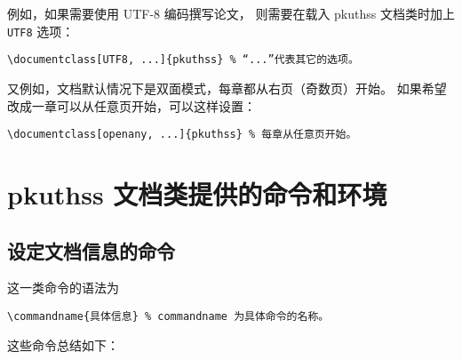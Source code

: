 例如，如果需要使用 UTF-8 编码撰写论文，
则需要在载入 pkuthss 文档类时加上 \verb|UTF8| 选项：
\begin{Verbatim}[frame = single]
\documentclass[UTF8, ...]{pkuthss} % “...”代表其它的选项。
\end{Verbatim}

又例如，文档默认情况下是双面模式，每章都从右页（奇数页）开始。
如果希望改成一章可以从任意页开始，可以这样设置：
\begin{Verbatim}[frame = single]
\documentclass[openany, ...]{pkuthss} % 每章从任意页开始。
\end{Verbatim}

\section{pkuthss 文档类提供的命令和环境}
\subsection{设定文档信息的命令}

这一类命令的语法为
\begin{Verbatim}[frame = single]
\commandname{具体信息} % commandname 为具体命令的名称。
\end{Verbatim}

这些命令总结如下：


